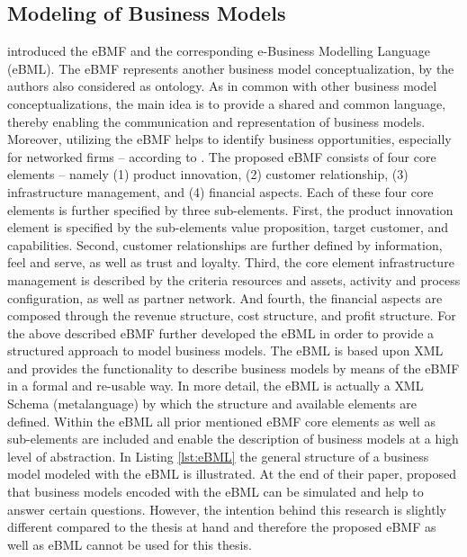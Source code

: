 \subsection{Modeling of Business Models}\label{ch:tf:rw:mbm}

\citet{BenLagha2001} introduced the \ac{eBMF} and the corresponding e-Business Modelling Language \linebreak (\acs{eBML}). The \ac{eBMF} represents another business model conceptualization, by the authors also considered as ontology. As in common with other business model conceptualizations, the main idea is to provide a shared and common language, thereby enabling the communication and representation of business models. Moreover, utilizing the \ac{eBMF} helps to identify business opportunities, especially for networked firms -- according to \citet{BenLagha2001}. The proposed \ac{eBMF} consists of four core elements -- namely (1) product innovation, (2) customer relationship, (3) infrastructure management, and (4) financial aspects. Each of these four core elements is further specified by three sub-elements. First, the product innovation element is specified by the sub-elements value proposition, target customer, and capabilities. Second, customer relationships are further defined by information, feel and serve, as well as trust and loyalty. Third, the core element infrastructure management is described by the criteria resources and assets, activity and process configuration, as well as partner network. And fourth, the financial aspects are composed through the revenue structure, cost structure, and profit structure. For the above described \ac{eBMF} \citet{BenLagha2001} further developed the \acs{eBML} in order to provide a structured approach to model business models. The \acs{eBML} is based upon \ac{XML} and provides the functionality to describe business models by means of the \ac{eBMF} in a formal and re-usable way. In more detail, the \acs{eBML} is actually a \ac{XML} Schema (metalanguage) by which the structure and available elements are defined. Within the \acs{eBML} all prior mentioned \ac{eBMF} core elements as well as sub-elements are included and enable the description of business models at a high level of abstraction. In Listing \ref{lst:eBML} the general structure of a business model modeled with the \acs{eBML} is illustrated. At the end of their paper, \citet{BenLagha2001} proposed that business models encoded with the \acs{eBML} can be simulated and help to answer certain questions. However, the intention behind this research is slightly different compared to the thesis at hand and therefore the proposed \ac{eBMF} as well as \acs{eBML} cannot be used for this thesis.

